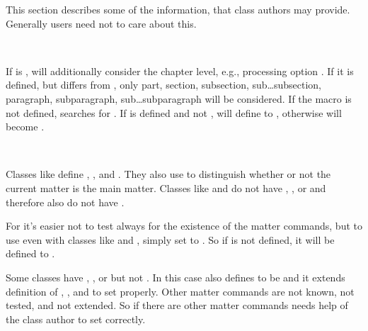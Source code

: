 This section describes some of the information, that class authors may
provide. Generally users need not to care about this.

\begin{Declaration}
  \  \ 
\end{Declaration}
%
If  is ,  will additionally
consider the chapter level, e.g., processing option . If it
is defined, but differs from , only part, section, subsection,
sub\dots subsection, paragraph, subparagraph, sub\dots subparagraph will be
considered. If the macro is not defined,  searches for
. If  is defined and not ,
 will define  to , otherwise
 will become .%

\begin{Declaration}
  \  \ 
\end{Declaration}
%
Classes like  define , , and
. They also use  to distinguish whether
or not the current matter is the main matter. Classes like  and
 do not have , , or
 and therefore also do not have .

For  it's easier not to test always for the existence of the
matter commands, but to use  even with classes like
 and , simply set to . So if
 is not defined, it will be defined to .

Some classes have , , or
 but not . In this case
 also defines  to be 
and it extends definition of , , and
 to set  properly. Other matter
commands are not known, not tested, and not extended. So if there are other
matter commands  needs help of the class author to set
 correctly.%

